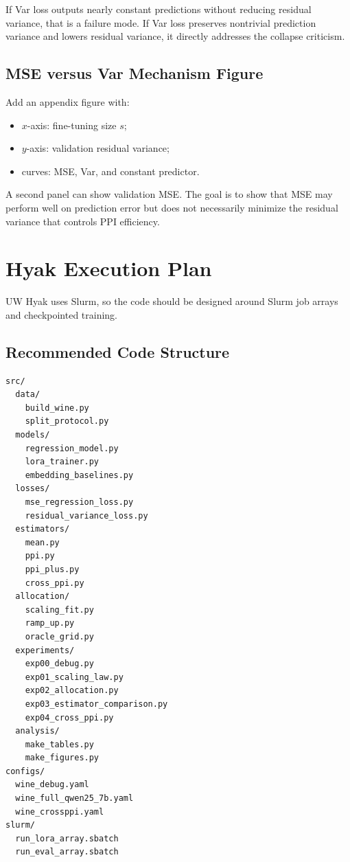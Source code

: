\documentclass[11pt]{article}
\begin{document}
If Var loss outputs nearly constant predictions without reducing residual variance, that is a failure mode. If Var loss preserves nontrivial prediction variance and lowers residual variance, it directly addresses the collapse criticism.

\subsection{MSE versus Var Mechanism Figure}

Add an appendix figure with:

\begin{itemize}
    \item $x$-axis: fine-tuning size $s$;
    \item $y$-axis: validation residual variance;
    \item curves: MSE, Var, and constant predictor.
\end{itemize}

A second panel can show validation MSE. The goal is to show that MSE may perform well on prediction error but does not necessarily minimize the residual variance that controls PPI efficiency.

\section{Hyak Execution Plan}

UW Hyak uses Slurm, so the code should be designed around Slurm job arrays and checkpointed training.

\subsection{Recommended Code Structure}

\begin{lstlisting}
src/
  data/
    build_wine.py
    split_protocol.py
  models/
    regression_model.py
    lora_trainer.py
    embedding_baselines.py
  losses/
    mse_regression_loss.py
    residual_variance_loss.py
  estimators/
    mean.py
    ppi.py
    ppi_plus.py
    cross_ppi.py
  allocation/
    scaling_fit.py
    ramp_up.py
    oracle_grid.py
  experiments/
    exp00_debug.py
    exp01_scaling_law.py
    exp02_allocation.py
    exp03_estimator_comparison.py
    exp04_cross_ppi.py
  analysis/
    make_tables.py
    make_figures.py
configs/
  wine_debug.yaml
  wine_full_qwen25_7b.yaml
  wine_crossppi.yaml
slurm/
  run_lora_array.sbatch
  run_eval_array.sbatch
\end{lstlisting}
\end{document}
